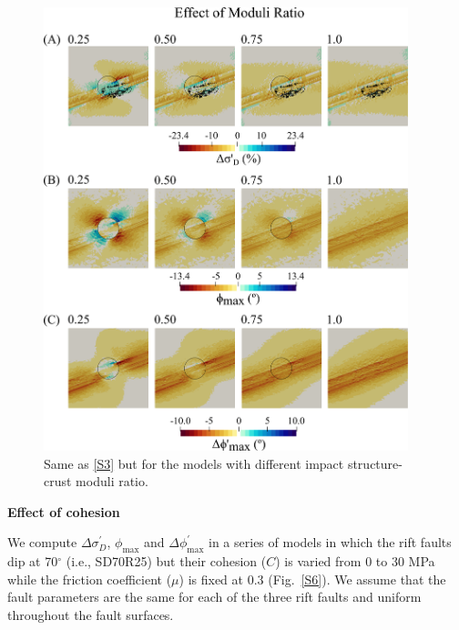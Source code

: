 \documentclass[draft,jgrga]{agutexSI2019}
\begin{document}
\begin{article}
\begin{figure}[ht]
\includegraphics[width=25pc]{Figures/effect_of_moduli_ratio.png}
\caption{Same as \ref{S3} but for the models with different impact structure-crust moduli ratio.}
\label{S5}
\end{figure}

\vspace{10mm} %

\noindent\textbf{Effect of cohesion}

We compute $\Delta \sigma_{D}^{\prime}$, $\phi_{\max}$ and $\Delta \phi_{\max}^{\prime}$ in a series of models in which the rift faults dip at 70$^{\circ}$ (i.e., SD70R25) but their cohesion ($C$) is varied from 0 to 30 MPa while the friction coefficient ($\mu$) is fixed at 0.3 (Fig.~\ref{S6}). We assume that the fault parameters are the same for each of the three rift faults and uniform throughout the fault surfaces.


\end{article}
\end{document}
